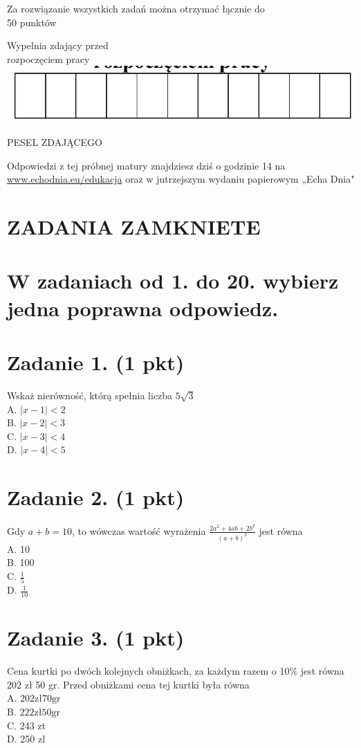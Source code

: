 \documentclass[10pt]{article}
\begin{document}
Za rozwiązanie wszystkich zadań można otrzymać łącznie do\\
50 punktów

Wypelnia zdający przed\\
rozpoczęciem pracy\\
\includegraphics[max width=\textwidth, center]{2024_11_21_2c2c97b7feae6d70b078g-01}

PESEL ZDAJĄCEGO

Odpowiedzi z tej próbnej matury znajdziesz dziś o godzinie 14 na \href{http://www.echodnia.eu/edukacja}{www.echodnia.eu/edukacja} oraz w jutrzejszym wydaniu papierowym „Echa Dnia"

\section*{ZADANIA ZAMKNIETE}
\section*{W zadaniach od 1. do 20. wybierz jedna poprawna odpowiedz.}
\section*{Zadanie 1. (1 pkt)}
Wskaż nierówność, którą spełnia liczba \(5 \sqrt{3}\)\\
A. \(|x-1|<2\)\\
B. \(|x-2|<3\)\\
C. \(|x-3|<4\)\\
D. \(|x-4|<5\)

\section*{Zadanie 2. (1 pkt)}
Gdy \(a+b=10\), to wówczas wartość wyrażenia \(\frac{2 a^{2}+4 a b+2 b^{2}}{(a+b)^{3}}\) jest równa\\
A. 10\\
B. 100\\
C. \(\frac{1}{5}\)\\
D. \(\frac{1}{10}\)

\section*{Zadanie 3. (1 pkt)}
Cena kurtki po dwóch kolejnych obniżkach, za każdym razem o 10\% jest równa 202 zł 50 gr. Przed obniżkami cena tej kurtki była równa\\
A. \(202 \mathrm{zł} 70 \mathrm{gr}\)\\
B. \(222 \mathrm{zł} 50 \mathrm{gr}\)\\
C. 243 zt\\
D. 250 zl
\end{document}
